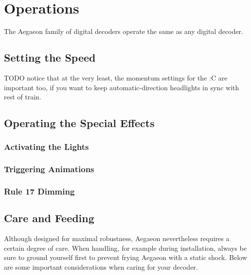 \documentclass[12pt,letterpaper,draft]{memoir} %
\begin{document}
\chapter{Operations}
\label{operations}

The Aegaeon family of digital decoders operate the same as any digital decoder.

\section{Setting the Speed}

TODO notice that at the very least, the momentum settings for the :C are important too, if you want to keep automatic-direction headlights in sync with rest of train.

\section{Operating the Special Effects}

\subsection{Activating the Lights}
\label{softstart}

\subsection{Triggering Animations}
\label{animations}

\subsection{Rule 17 Dimming}
\label{Rule17}

\section{Care and Feeding}

Although designed for maximal robustness, Aegaeon nevertheless requires a certain degree of care. When handling, for example during installation, always be sure to ground yourself first to prevent frying Aegaeon with a static shock. Below are some important considerations when caring for your decoder.
\end{document}
